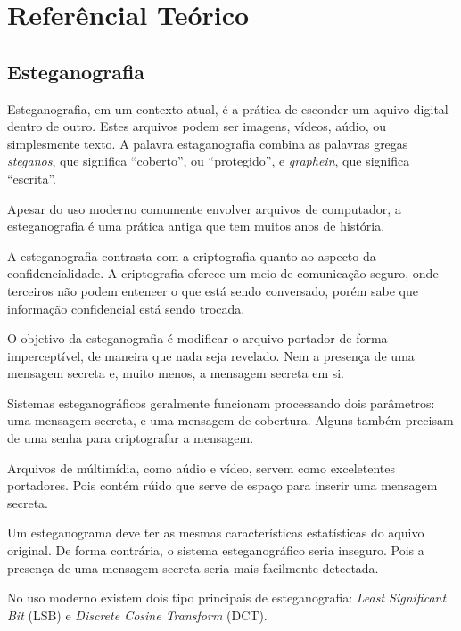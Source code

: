 \newcommand{\chisquare}{$\chi^2$}

\chapter{Referêncial Teórico}

\section{Esteganografia}

Esteganografia, em um contexto atual, é a prática de esconder um aquivo digital dentro de outro. Estes arquivos podem ser imagens, vídeos, aúdio, ou simplesmente texto. A palavra estaganografia combina as palavras gregas \emph{steganos}, que significa ``coberto'', ou ``protegido'', e \emph{graphein}, que significa ``escrita''.

Apesar do uso moderno comumente envolver arquivos de computador, a esteganografia é uma prática antiga que tem muitos anos de história.

A esteganografia contrasta com a criptografia quanto ao aspecto da confidencialidade. A criptografia oferece um meio de comunicação seguro, onde terceiros não podem enteneer o que está sendo conversado, porém sabe que informação confidencial está sendo trocada.

O objetivo da esteganografia é modificar o arquivo portador de forma imperceptível, de maneira que nada seja revelado. Nem a presença de uma mensagem secreta e, muito menos, a mensagem secreta em si. \cite{westfeld1999attacks}

Sistemas esteganográficos geralmente funcionam processando dois parâmetros: uma mensagem secreta, e uma mensagem de cobertura. \cite{westfeld1999attacks}  %
Alguns também precisam de uma senha para criptografar a mensagem. \cite{??}

Arquivos de múltimídia, como aúdio e vídeo, servem como exceletentes portadores. Pois contém rúido que serve de espaço para inserir uma mensagem secreta. \cite{westfeld1999attacks}

Um esteganograma deve ter as mesmas características estatísticas do aquivo original. De forma contrária, o sistema esteganográfico seria inseguro. \cite{westfeld1999attacks} Pois a presença de uma mensagem secreta seria mais facilmente detectada.

No uso moderno existem dois tipo principais de esteganografia: \emph{Least Significant Bit} (LSB) e \emph{Discrete Cosine Transform} (DCT).


